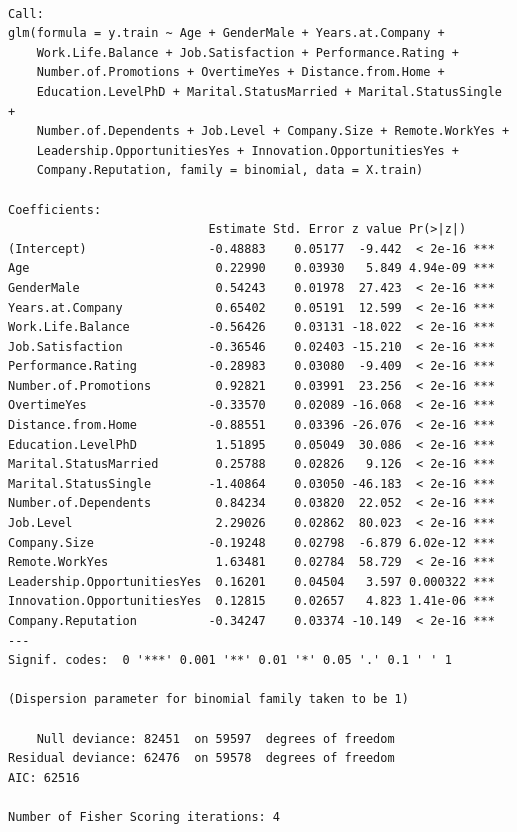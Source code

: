 \documentclass[
  10pt,
  paper=a4,
  ,captions=tableheading
]{scrartcl}
\newenvironment{Shaded}{\begin{snugshade}}{\end{snugshade}}
\newcommand{\AttributeTok}[1]{\textcolor[rgb]{0.13,0.29,0.53}{#1}}
\newcommand{\ConstantTok}[1]{\textcolor[rgb]{0.56,0.35,0.01}{#1}}
\newcommand{\DecValTok}[1]{\textcolor[rgb]{0.00,0.00,0.81}{#1}}
\newcommand{\FunctionTok}[1]{\textcolor[rgb]{0.13,0.29,0.53}{\textbf{#1}}}
\newcommand{\NormalTok}[1]{#1}
\newcommand{\OtherTok}[1]{\textcolor[rgb]{0.56,0.35,0.01}{#1}}
\newcommand{\SpecialCharTok}[1]{\textcolor[rgb]{0.81,0.36,0.00}{\textbf{#1}}}
\begin{document}
\begin{verbatim}

Call:
glm(formula = y.train ~ Age + GenderMale + Years.at.Company + 
    Work.Life.Balance + Job.Satisfaction + Performance.Rating + 
    Number.of.Promotions + OvertimeYes + Distance.from.Home + 
    Education.LevelPhD + Marital.StatusMarried + Marital.StatusSingle + 
    Number.of.Dependents + Job.Level + Company.Size + Remote.WorkYes + 
    Leadership.OpportunitiesYes + Innovation.OpportunitiesYes + 
    Company.Reputation, family = binomial, data = X.train)

Coefficients:
                            Estimate Std. Error z value Pr(>|z|)    
(Intercept)                 -0.48883    0.05177  -9.442  < 2e-16 ***
Age                          0.22990    0.03930   5.849 4.94e-09 ***
GenderMale                   0.54243    0.01978  27.423  < 2e-16 ***
Years.at.Company             0.65402    0.05191  12.599  < 2e-16 ***
Work.Life.Balance           -0.56426    0.03131 -18.022  < 2e-16 ***
Job.Satisfaction            -0.36546    0.02403 -15.210  < 2e-16 ***
Performance.Rating          -0.28983    0.03080  -9.409  < 2e-16 ***
Number.of.Promotions         0.92821    0.03991  23.256  < 2e-16 ***
OvertimeYes                 -0.33570    0.02089 -16.068  < 2e-16 ***
Distance.from.Home          -0.88551    0.03396 -26.076  < 2e-16 ***
Education.LevelPhD           1.51895    0.05049  30.086  < 2e-16 ***
Marital.StatusMarried        0.25788    0.02826   9.126  < 2e-16 ***
Marital.StatusSingle        -1.40864    0.03050 -46.183  < 2e-16 ***
Number.of.Dependents         0.84234    0.03820  22.052  < 2e-16 ***
Job.Level                    2.29026    0.02862  80.023  < 2e-16 ***
Company.Size                -0.19248    0.02798  -6.879 6.02e-12 ***
Remote.WorkYes               1.63481    0.02784  58.729  < 2e-16 ***
Leadership.OpportunitiesYes  0.16201    0.04504   3.597 0.000322 ***
Innovation.OpportunitiesYes  0.12815    0.02657   4.823 1.41e-06 ***
Company.Reputation          -0.34247    0.03374 -10.149  < 2e-16 ***
---
Signif. codes:  0 '***' 0.001 '**' 0.01 '*' 0.05 '.' 0.1 ' ' 1

(Dispersion parameter for binomial family taken to be 1)

    Null deviance: 82451  on 59597  degrees of freedom
Residual deviance: 62476  on 59578  degrees of freedom
AIC: 62516

Number of Fisher Scoring iterations: 4
\end{verbatim}

\begin{Shaded}
\end{Shaded}
\end{document}
